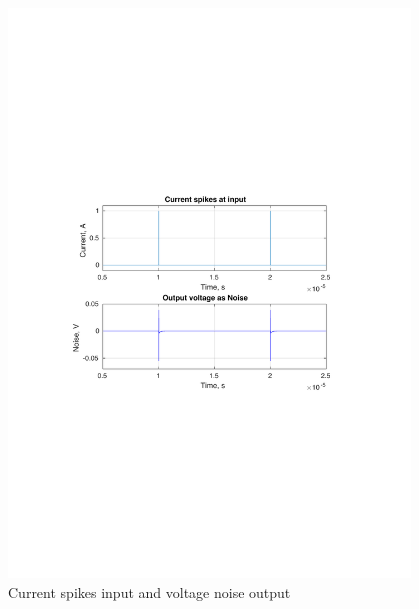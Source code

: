 \documentclass[12pt,a4paper,UKenglish]{article}
\begin{document}
\begin{figure} [H]
  \centering 
  \includegraphics[width=0.95\textwidth]{img/3e_tran.pdf} 
  \caption{Current spikes input and voltage noise output}
  \label{cap_tran} 
\end{figure}
\end{document}
